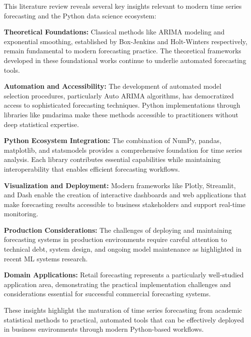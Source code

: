 \STANDARD{}
{
	
	This literature review reveals several key insights relevant to modern time series forecasting and the Python data science ecosystem:
	
	\textbf{Theoretical Foundations:} Classical methods like ARIMA modeling and exponential smoothing, established by Box-Jenkins and Holt-Winters respectively, remain fundamental to modern forecasting practice. The theoretical frameworks developed in these foundational works continue to underlie automated forecasting tools.
	
	\textbf{Automation and Accessibility:} The development of automated model selection procedures, particularly Auto ARIMA algorithms, has democratized access to sophisticated forecasting techniques. Python implementations through libraries like pmdarima make these methods accessible to practitioners without deep statistical expertise.
	
	\textbf{Python Ecosystem Integration:} The combination of NumPy, pandas, matplotlib, and statsmodels provides a comprehensive foundation for time series analysis. Each library contributes essential capabilities while maintaining interoperability that enables efficient forecasting workflows.
	
	\textbf{Visualization and Deployment:} Modern frameworks like Plotly, Streamlit, and Dash enable the creation of interactive dashboards and web applications that make forecasting results accessible to business stakeholders and support real-time monitoring.
	
	\textbf{Production Considerations:} The challenges of deploying and maintaining forecasting systems in production environments require careful attention to technical debt, system design, and ongoing model maintenance as highlighted in recent ML systems research.
	
	\textbf{Domain Applications:} Retail forecasting represents a particularly well-studied application area, demonstrating the practical implementation challenges and considerations essential for successful commercial forecasting systems.
	
	These insights highlight the maturation of time series forecasting from academic statistical methods to practical, automated tools that can be effectively deployed in business environments through modern Python-based workflows.
	
}